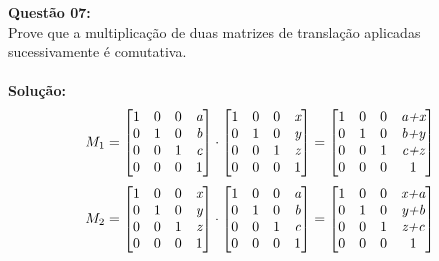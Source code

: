 \documentclass[10pt]{article}
\begin{document}
\vspace{1cm}
\noindent\textbf{Questão 07:}\\
Prove que a multiplicação de duas matrizes de translação aplicadas sucessivamente é comutativa.\\
\\
\noindent\textbf{Solução:}
\[
    M_1 =
	\begin{bmatrix}
        1 & 0 & 0 & \emph{a}\\
        0 & 1 & 0 & \emph{b}\\
        0 & 0 & 1 & \emph{c}\\
        0 & 0 & 0 & 1
    \end{bmatrix}
    \cdot  
    \begin{bmatrix}
        1 & 0 & 0 & \emph{x}\\
        0 & 1 & 0 & \emph{y}\\
        0 & 0 & 1 & \emph{z}\\
        0 & 0 & 0 & 1
    \end{bmatrix}
    =
    \begin{bmatrix}
        1 & 0 & 0 & \emph{a+x}\\
        0 & 1 & 0 & \emph{b+y}\\
        0 & 0 & 1 & \emph{c+z}\\
        0 & 0 & 0 & 1
    \end{bmatrix}
\]
\[
    M_2 =
	\begin{bmatrix}
        1 & 0 & 0 & \emph{x}\\
        0 & 1 & 0 & \emph{y}\\
        0 & 0 & 1 & \emph{z}\\
        0 & 0 & 0 & 1
    \end{bmatrix}
    \cdot  
    \begin{bmatrix}
        1 & 0 & 0 & \emph{a}\\
        0 & 1 & 0 & \emph{b}\\
        0 & 0 & 1 & \emph{c}\\
        0 & 0 & 0 & 1
    \end{bmatrix}
    =
    \begin{bmatrix}
        1 & 0 & 0 & \emph{x+a}\\
        0 & 1 & 0 & \emph{y+b}\\
        0 & 0 & 1 & \emph{z+c}\\
        0 & 0 & 0 & 1
    \end{bmatrix}
\]
\end{document}
